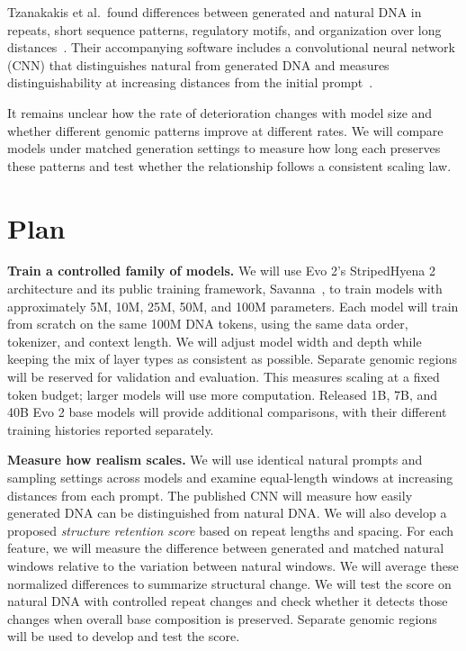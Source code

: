 \documentclass[11pt,letterpaper]{article}
\begin{document}
Tzanakakis et al.\ found differences between generated and natural DNA in repeats, short sequence patterns, regulatory motifs, and organization over long distances~\cite{limitations}. Their accompanying software includes a convolutional neural network (CNN) that distinguishes natural from generated DNA and measures distinguishability at increasing distances from the initial prompt~\cite{benchmark}.

It remains unclear how the rate of deterioration changes with model size and whether different genomic patterns improve at different rates. We will compare models under matched generation settings to measure how long each preserves these patterns and test whether the relationship follows a consistent scaling law.

\newpage
\section{Plan}
\textbf{Train a controlled family of models.} We will use Evo 2's StripedHyena 2 architecture and its public training framework, Savanna~\cite{savanna}, to train models with approximately 5M, 10M, 25M, 50M, and 100M parameters. Each model will train from scratch on the same 100M DNA tokens, using the same data order, tokenizer, and context length. We will adjust model width and depth while keeping the mix of layer types as consistent as possible. Separate genomic regions will be reserved for validation and evaluation. This measures scaling at a fixed token budget; larger models will use more computation. Released 1B, 7B, and 40B Evo 2 base models will provide additional comparisons, with their different training histories reported separately.

\textbf{Measure how realism scales.} We will use identical natural prompts and sampling settings across models and examine equal-length windows at increasing distances from each prompt. The published CNN will measure how easily generated DNA can be distinguished from natural DNA. We will also develop a proposed \emph{structure retention score} based on repeat lengths and spacing. For each feature, we will measure the difference between generated and matched natural windows relative to the variation between natural windows. We will average these normalized differences to summarize structural change. We will test the score on natural DNA with controlled repeat changes and check whether it detects those changes when overall base composition is preserved. Separate genomic regions will be used to develop and test the score.
\end{document}
